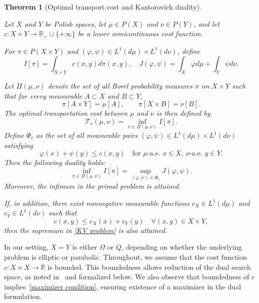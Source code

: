 \documentclass[12pt]{amsart}
\newtheorem{thm}{Theorem}
\begin{document}
\begin{thm}[Optimal transport cost and Kantorovich duality]\label{KV thm}

    Let $X$ and $Y$ be Polish spaces, let $\mu \in P(X)$ and $\nu \in P(Y)$, and let $c: X \times Y \to \mathbb{R}_{+} \cup \{+\infty\}$ be a lower semicontinuous cost function. 

    For $\pi \in P(X \times Y)$ and $(\varphi, \psi) \in L^1(d\mu) \times L^1(d\nu)$, define
    $$
    I[\pi]=\int_{X \times Y} c(x, y) d \pi(x, y), \quad J(\varphi, \psi)=\int_X \varphi d \mu+\int_Y \psi d \nu.
    $$

    Let $\Pi(\mu, \nu)$ denote the set of all Borel probability measures $\pi$ on $X \times Y$ such that for every measurable $A \subset X$ and $B \subset Y$,
    $$
    \pi[A \times Y]=\mu[A], \qquad \pi[X \times B]=\nu[B].
    $$
    The optimal transportation cost between $\mu$ and $\nu$ is then defined by
    $$
    \mathcal{T}_c(\mu, \nu)=\inf_{\pi \in \Pi(\mu, \nu)} I[\pi].
    $$
    Define $\Phi_c$ as the set of all measurable pairs $(\varphi, \psi) \in L^1(d\mu)\times L^1(d\nu)$ satisfying
    $$
    \varphi(x)+\psi(y)\le c(x,y)
    \quad\text{for } \mu\text{-a.e. }x\in X,\ \nu\text{-a.e. }y\in Y.
    $$
    Then the following duality holds:
    \begin{equation}\label{KV problem}
    \inf_{\pi \in \Pi(\mu, \nu)} I[\pi]
    =\sup_{(\varphi,\psi)\in\Phi_c} J(\varphi, \psi).
    \end{equation}
    Moreover, the infimum in the primal problem is attained. 

    If, in addition, there exist nonnegative measurable functions $c_X \in L^1(d\mu)$ and $c_Y \in L^1(d\nu)$ such that
    \begin{equation}\label{maximizer condition}
    c(x, y) \le c_X(x)+c_Y(y)
    \quad \forall (x, y)\in X\times Y,
    \end{equation}
    then the supremum in \eqref{KV problem} is also attained.

\end{thm}

In our setting, $X=Y$ is either $\Omega$ or $Q$, depending on whether the underlying problem is elliptic or parabolic. Throughout, we assume that the cost function $c:X\times X\to\mathbb{R}$ is bounded. This boundedness allows reduction of the dual search space, as noted in~\cite[Remark~1.13]{villani2003topics} and formalized below. We also observe that boundedness of $c$ implies~\eqref{maximizer condition}, ensuring existence of a maximizer in the dual formulation.
\end{document}
